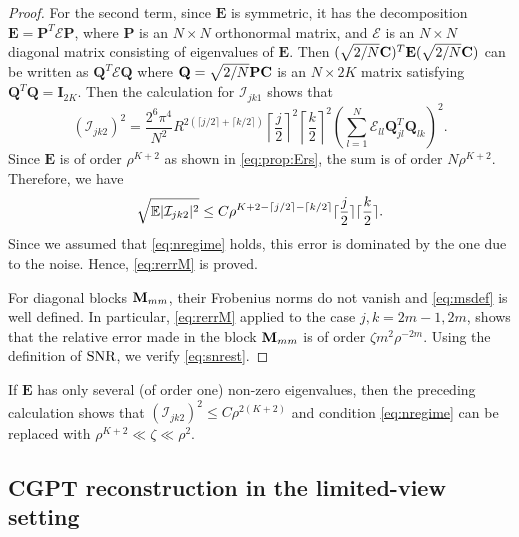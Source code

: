 \begin{proof}
For the second term, since $\mathbf{E}$ is symmetric, it has the
decomposition $\mathbf{E} = \mathbf{P}^T \mathcal{E} \mathbf{P}$,
where $\mathbf{P}$ is an $N \times N$ orthonormal matrix, and
$\mathcal{E}$ is an $N \times N$ diagonal matrix consisting of
eigenvalues of $\mathbf{E}$. Then $(\sqrt{2/N}\mathbf{C})^T \mathbf{E}
(\sqrt{2/N}\mathbf{C})$ can be written as $\mathbf{Q}^T \mathcal{E}
\mathbf{Q}$ where $\mathbf{Q} = \sqrt{2/N} \mathbf{P} \mathbf{C}$ is
an $N \times 2K$ matrix satisfying $\mathbf{Q}^T \mathbf{Q} =
\mathbf{I}_{2K}$. Then the calculation for $\mathcal{I}_{jk1}$
shows that
\begin{equation*}
(\mathcal{I}_{jk2})^2  = \frac{2^6\pi^4}{N^2} R^{2(\lceil j/2
\rceil + \lceil k/2 \rceil)} \left\lceil \frac{j}{2} \right
\rceil^2 \left\lceil \frac{k}{2} \right\rceil^2 \left(\sum_{l=1}^N
\mathcal{E}_{ll} \mathbf{Q}^T_{jl} \mathbf{Q}_{lk} \right)^2.
\end{equation*}
Since $\mathbf{E}$ is of order $\rho^{K+2}$ as shown in
\eqref{eq:prop:Ers}, the sum is of order $N\rho^{K+2}$. Therefore,
we have
$$\sqrt{\mathbb{E} |\mathcal{I}_{jk2}|^2} \le C\rho^{K+2 -\lceil j/2 \rceil
- \lceil k/2 \rceil} \lceil \frac{j}{2}\rceil \lceil \frac{k}{2}
\rceil .$$ Since we assumed that \eqref{eq:nregime} holds, this
error is dominated by the one due to the noise. Hence,
\eqref{eq:rerrM} is proved.

For diagonal blocks $\mathbf{M}_{mm}$, their Frobenius norms do not
vanish and \eqref{eq:msdef} is well defined. In particular,
\eqref{eq:rerrM} applied to the case $j,k = 2m-1, 2m$, shows that
the relative error made in the block $\mathbf{M}_{mm}$ is of order
$\zeta m^2 \rho^{-2m}$. Using the definition of
$\mathrm{SNR}$, we verify \eqref{eq:snrest}.
\end{proof}

\begin{remark} \label{rem:whyN}
If $\mathbf{E}$ has only several (of order one) non-zero
eigenvalues, then the preceding calculation shows that
$(\mathcal{I}_{jk2})^2 \le C\rho^{2(K+2)}$ and condition
\eqref{eq:nregime} can be replaced with $\rho^{K+2} \ll
\zeta \ll \rho^2$.
\end{remark}

\subsection{CGPT reconstruction in the limited-view setting}
\label{sec:limited_angle_view}

